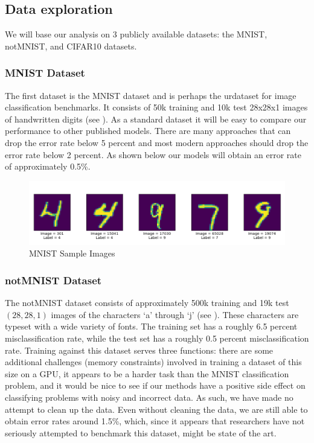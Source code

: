 \documentclass[english,a4paper,oneside]{amsart}
\theoremstyle{definition}
\begin{document}
\subsection{Data exploration}
We will base our analysis on 3 publicly available datasets: the MNIST,  notMNIST, and CIFAR10 datasets. 

\subsubsection{MNIST Dataset}
The first dataset is the MNIST dataset and is perhaps the urdataset for image classification benchmarks. It consists of 50k training and 10k test 28x28x1 images of handwritten digits (see ). As a standard dataset it will be easy to compare our performance to other published models. There are many approaches that can drop the error rate below 5 percent and most modern approaches should drop the error rate below 2 percent.  As shown below our models will obtain an error rate of approximately 0.5\%.
\begin{figure}[H]
	\begin{center} \includegraphics[scale=0.5]{images/MNIST_Sample_Images.png}\end{center}
	\caption{MNIST Sample Images}\label{MNISTFig}
\end{figure}

\subsubsection{notMNIST Dataset}
The notMNIST dataset consists of approximately 500k training and 19k test $(28,28,1)$ images of the characters `a' through `j' (see ). These characters are typeset with a wide variety of fonts. The training set has a roughly 6.5 percent misclassification rate, while the test set has a roughly 0.5 percent misclassification rate. Training against this dataset serves three functions: there are some additional challenges (memory constraints) involved in training a dataset of this size on a GPU, it appears to be a harder task than the MNIST classification problem, and it would be nice to see if our methods have a positive side effect on classifying problems with noisy and incorrect data. As such, we have made no attempt to clean up the data. Even without cleaning the data, we are still able to obtain error rates around 1.5\%, which, since it appears that researchers have not seriously attempted to benchmark this dataset, might be state of the art.
\end{document}
